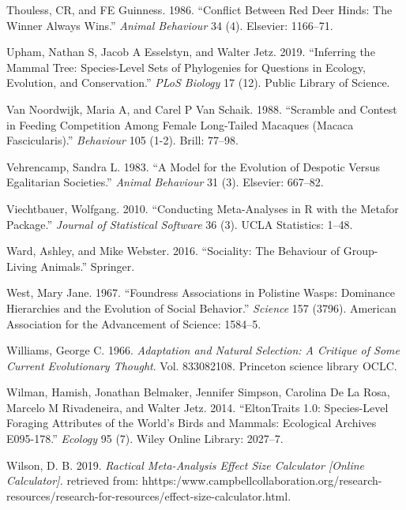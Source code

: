 \documentclass[]{article}
\begin{document}
\leavevmode\hypertarget{ref-thouless1986conflict}{}%
Thouless, CR, and FE Guinness. 1986. ``Conflict Between Red Deer Hinds:
The Winner Always Wins.'' \emph{Animal Behaviour} 34 (4). Elsevier:
1166--71.

\leavevmode\hypertarget{ref-upham2019inferring}{}%
Upham, Nathan S, Jacob A Esselstyn, and Walter Jetz. 2019. ``Inferring
the Mammal Tree: Species-Level Sets of Phylogenies for Questions in
Ecology, Evolution, and Conservation.'' \emph{PLoS Biology} 17 (12).
Public Library of Science.

\leavevmode\hypertarget{ref-van1988scramble}{}%
Van Noordwijk, Maria A, and Carel P Van Schaik. 1988. ``Scramble and
Contest in Feeding Competition Among Female Long-Tailed Macaques (Macaca
Fascicularis).'' \emph{Behaviour} 105 (1-2). Brill: 77--98.

\leavevmode\hypertarget{ref-vehrencamp1983model}{}%
Vehrencamp, Sandra L. 1983. ``A Model for the Evolution of Despotic
Versus Egalitarian Societies.'' \emph{Animal Behaviour} 31 (3).
Elsevier: 667--82.

\leavevmode\hypertarget{ref-viechtbauer2010conducting}{}%
Viechtbauer, Wolfgang. 2010. ``Conducting Meta-Analyses in R with the
Metafor Package.'' \emph{Journal of Statistical Software} 36 (3). UCLA
Statistics: 1--48.

\leavevmode\hypertarget{ref-ward2016sociality}{}%
Ward, Ashley, and Mike Webster. 2016. ``Sociality: The Behaviour of
Group-Living Animals.'' Springer.

\leavevmode\hypertarget{ref-west1967foundress}{}%
West, Mary Jane. 1967. ``Foundress Associations in Polistine Wasps:
Dominance Hierarchies and the Evolution of Social Behavior.''
\emph{Science} 157 (3796). American Association for the Advancement of
Science: 1584--5.

\leavevmode\hypertarget{ref-williams1966adaptation}{}%
Williams, George C. 1966. \emph{Adaptation and Natural Selection: A
Critique of Some Current Evolutionary Thought}. Vol. 833082108.
Princeton science library OCLC.

\leavevmode\hypertarget{ref-wilman2014eltontraits}{}%
Wilman, Hamish, Jonathan Belmaker, Jennifer Simpson, Carolina De La
Rosa, Marcelo M Rivadeneira, and Walter Jetz. 2014. ``EltonTraits 1.0:
Species-Level Foraging Attributes of the World's Birds and Mammals:
Ecological Archives E095-178.'' \emph{Ecology} 95 (7). Wiley Online
Library: 2027--7.

\leavevmode\hypertarget{ref-wilson2019calculator}{}%
Wilson, D. B. 2019. \emph{Ractical Meta-Analysis Effect Size Calculator
{[}Online Calculator{]}.} retrieved from:
hhttps:/www.campbellcollaboration.org/research-resources/research-for-resources/effect-size-calculator.html.
\end{document}
